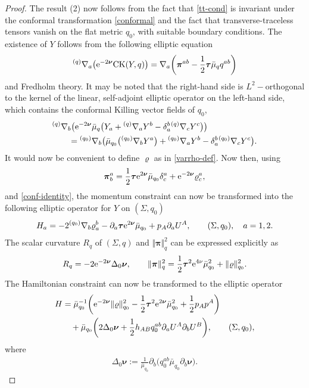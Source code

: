 \documentclass[11pt]{article}
\numberwithin{equation}{section}
\def\ptl{\partial}%
\def\mbo#1{\boldsymbol{#1}}%
\def\grad{{\nabla}}%
\newcommand{\leftexp}[2]{{\vphantom{#2}}^{#1}{#2}}
\def\halb{\frac{1}{2}}%
\numberwithin{equation}{section}
\begin{document}
\begin{proof}
The result (2) now follows from the fact that \eqref{tt-cond} is invariant under the conformal transformation \eqref{conformal} and the fact that transverse-traceless tensors vanish on the flat metric $q_0$, with suitable boundary conditions. The existence of $Y$ follows from the following elliptic equation
\begin{align*}
\leftexp{(q)}{\grad}_a \bigl({\rm e}^{-2 \mbo{\nu}} {\rm CK} (Y, q)\bigr) = \grad_a \biggl(\mbo{\pi}^{ab} -\halb \mbo{\tau} \bar{\mu}_q q^{ab}\biggr)
\end{align*}
 and Fredholm theory. It may be noted that the right-hand side is $L^2-$orthogonal to the kernel of the linear, self-adjoint elliptic operator on the left-hand side, which contains the conformal Killing vector fields of $q_0$,
\begin{align} %
&\leftexp{(q)}{\grad}_b \bigl({\rm e}^{-2\mbo{\nu}} \bar{\mu}_q \bigl(Y_a + \leftexp{(q)}{\grad}_a Y^b - \delta^b_a \leftexp{(q)}{\grad}_c Y^c\bigr) \bigr) \notag\\
&\qquad{}= \leftexp{(q_0)}{\grad}_b \bigl(\bar{\mu}_{q_0}\bigl(\leftexp{(q_0)}{\grad}_b Y^a\bigr) + \leftexp{(q_0)}{\grad}_a Y^b - \delta^b_a \leftexp{(q_0)}{\grad}_c Y^c\bigr) . \label{conf-identity}
\end{align}
It would now be convenient to define $\varrho$ as in \eqref{varrho-def}. Now then, using
\begin{align*}
\mbo{\pi}^a_b = \halb \mbo{\tau} {\rm e}^{2 \mbo{\nu}} \bar{\mu}_{q_0} \delta^a_c + {\rm e}^{-2 \mbo{\nu}} \varrho^a_c,
\end{align*}
and \eqref{conf-identity}, the momentum constraint can now be transformed into the following elliptic operator for $Y$ on $(\Sigma, q_0)$
\begin{align*}
H_a = -2\leftexp{(q_0)}{\grad}_b \varrho^b_a - \ptl_a \mbo{\tau} {\rm e}^{2 \mbo{\nu}} \bar{\mu}_{q_0} + p_A \ptl_a U^A, \qquad (\Sigma, q_0), \quad a= 1, 2.
\end{align*}
The scalar curvature $R_q$ of $(\Sigma, q)$ and $\Vert \mbo{\pi} \Vert^2_q$ can be expressed explicitly as
\begin{align*}
R_q = -2 {\rm e}^{-2 \mbo{\nu}} \Delta_0 \mbo{\nu}, \qquad \Vert \mbo{\pi} \Vert^2_q = \halb \mbo{\tau}^2 {\rm e}^{4 \nu} \bar{\mu}^2_{q_0} + \Vert \varrho \Vert^2_{q_0}.
\end{align*}
The Hamiltonian constraint can now be transformed to the elliptic operator
\begin{align*}
H &{}= \bar{\mu}^{-1}_{q_0} \biggl({\rm e}^{-2 \mbo{\nu}} \Vert \varrho \Vert^2_{q_0} - \halb \mbo{\tau}^2 {\rm e}^{2 \mbo{\nu}} \bar{\mu}^2_{q_0} + \halb p_A p^A\biggr) \notag\\
&\quad{}+ \bar{\mu}_{q_0} \biggl(2 \Delta_0 \mbo{\nu} + \halb h_{AB} q_0^{ab} \ptl_a U^A \ptl_b U^B\biggr), \qquad (\Sigma, q_0),
\end{align*}
where
\begin{align*}
\Delta_0 \mbo{\nu} := \frac{1}{\bar{\mu}_{q_0}} \ptl_b\bigl(q^{ab}_0 \bar{\mu}_{q_0} \ptl_b \mbo{\nu}\bigr).
\tag*{\qed}
\end{align*}
\renewcommand{\qed}{}
\end{proof}
\end{document}
